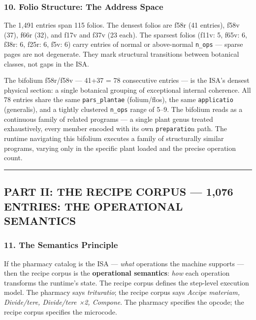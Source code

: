 \hypertarget{folio-structure-the-address-space}{%
\subsubsection{10. Folio Structure: The Address
Space}\label{folio-structure-the-address-space}}

The 1,491 entries span 115 folios. The densest folios are f58r (41
entries), f58v (37), f66r (32), and f17v and f37v (23 each). The
sparsest folios (f11v: 5, f65v: 6, f38r: 6, f25r: 6, f5v: 6) carry
entries of normal or above-normal \texttt{n\_ops} --- sparse pages are
not degenerate. They mark structural transitions between botanical
classes, not gaps in the ISA.

The bifolium f58r/f58v --- 41+37 = 78 consecutive entries --- is the
ISA's densest physical section: a single botanical grouping of
exceptional internal coherence. All 78 entries share the same
\texttt{pars\_plantae} (folium/flos), the same \texttt{applicatio}
(generalis), and a tightly clustered \texttt{n\_ops} range of 5--9. The
bifolium reads as a continuous family of related programs --- a single
plant genus treated exhaustively, every member encoded with its own
\texttt{preparatio}n path. The runtime navigating this bifolium executes
a family of structurally similar programs, varying only in the specific
plant loaded and the precise operation count.

\begin{center}\rule{0.5\linewidth}{0.5pt}\end{center}

\hypertarget{part-ii-the-recipe-corpus-1076-entries-the-operational-semantics}{%
\subsection{PART II: THE RECIPE CORPUS --- 1,076 ENTRIES: THE
OPERATIONAL
SEMANTICS}\label{part-ii-the-recipe-corpus-1076-entries-the-operational-semantics}}

\hypertarget{the-semantics-principle}{%
\subsubsection{11. The Semantics
Principle}\label{the-semantics-principle}}

If the pharmacy catalog is the ISA --- \emph{what} operations the
machine supports --- then the recipe corpus is the \textbf{operational
semantics}: \emph{how} each operation transforms the runtime's state.
The recipe corpus defines the step-level execution model. The pharmacy
says \emph{trituratio}; the recipe corpus says \emph{Accipe materiam,
Divide/tere, Divide/tere ×2, Compone}. The pharmacy specifies the
opcode; the recipe corpus specifies the microcode.

